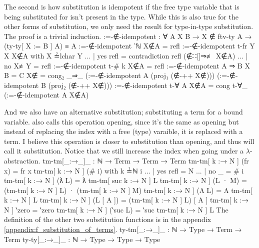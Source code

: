 \documentclass[logo,bsc,singlespacing,parskip,online]{infthesis}
\renewenvironment{code}{\mintedcopy[breaklines,breaksymbolleft=\;]{agda}}{\endmintedcopy}
\begin{document}
The second is how substitution is idempotent if the free type variable that is being substituted for
isn't present in the type. While this is also true for the other forms of substitution, we only need
the result for type-in-type substitution. The proof is a trivial induction.
\begin{code}
  :=-∉-idempotent : ∀ {A X B} → X ∉ ftv-ty A
    → (ty-ty[ X := B ] A) ≡ A
  :=-∉-idempotent {‵ℕ} X∉A = refl
  :=-∉-idempotent {t-fr Y} {X} X∉A with X ≟lchar Y
  ... | yes refl = contradiction refl (∉∷[]⇒≢ X∉A)
  ... | no  X≢Y  = refl
  :=-∉-idempotent {t-# k} X∉A = refl
  :=-∉-idempotent {A ⇒ B} {X} {B = C} X∉ = cong₂ _⇒_
    (:=-∉-idempotent {A} (proj₁ (∉-++ X∉)))
    (:=-∉-idempotent {B} (proj₂ (∉-++ X∉)))
  :=-∉-idempotent {t-∀ A} X∉A =
    cong t-∀_ (:=-∉-idempotent {A} X∉A)
\end{code}

And we also have an alternative substitution; substituting a term for a bound variable.
\citet{chargueraud_locally_2012} also calls this operation opening, since it's the same as opening
but instead of replacing the index with a free (type) varaible, it is replaced with a term. I
believe this operation is closer to substitution than opening, and thus will call it substitution.
Notice that we still increase the index when going under a $\lambda$-abstraction.
\begin{code}
  tm-tm[_:→_]_ : ℕ → Term → Term → Term
  tm-tm[ k :→ N ] (fr x) = fr x
  tm-tm[ k :→ N ] (# i) with k ≟ℕ i
  ... | yes refl = N
  ... | no  _    = # i
  tm-tm[ k :→ N ] (ƛ L) = ƛ tm-tm[ suc k :→ N ] L
  tm-tm[ k :→ N ] (L · M) = (tm-tm[ k :→ N ] L) · (tm-tm[ k :→ N ] M)
  tm-tm[ k :→ N ] (Λ L) = Λ tm-tm[ k :→ N ] L
  tm-tm[ k :→ N ] (L [ A ]) = (tm-tm[ k :→ N ] L) [ A ]
  tm-tm[ k :→ N ] ‵zero = ‵zero
  tm-tm[ k :→ N ] (‵suc L) = ‵suc tm-tm[ k :→ N ] L
\end{code}
The definition of the other two substitution functions is in the appendix \ref{appendix:f_substitution_of_terms}.
\begin{code}
  ty-tm[_:→_]_ : ℕ → Type → Term → Term
  ty-ty[_:→_]_ : ℕ → Type → Type → Type
\end{code}
\begin{comment}
\begin{code}
  ty-tm[ k :→ T ] (fr x) = fr x
  ty-tm[ k :→ T ] (# i) = # i
  ty-tm[ k :→ T ] (ƛ L) = ƛ ty-tm[ k :→ T ] L
  ty-tm[ k :→ T ] (L · M) = (ty-tm[ k :→ T ] L) · (ty-tm[ k :→ T ] M)
  ty-tm[ k :→ T ] (Λ L) = Λ ty-tm[ suc k :→ T ] L
  ty-tm[ k :→ T ] (L [ A ]) = (ty-tm[ k :→ T ] L) [ ty-ty[ k :→ T ] A ]
  ty-tm[ k :→ T ] ‵zero = ‵zero
  ty-tm[ k :→ T ] (‵suc L) = ‵suc ty-tm[ k :→ T ] L

  ty-ty[ k :→ T ] ‵ℕ = ‵ℕ
  ty-ty[ k :→ T ] (t-fr x) = t-fr x
  ty-ty[ k :→ T ] (t-# i) with k ≟ℕ i
  ... | yes refl = T
  ... | no  _    = t-# i
  ty-ty[ k :→ T ] (A ⇒ B) = (ty-ty[ k :→ T ] A) ⇒ (ty-ty[ k :→ T ] B)
  ty-ty[ k :→ T ] (t-∀ A) = t-∀ (ty-ty[ (suc k) :→ T ] A)
\end{code}
\end{comment}
\end{document}
